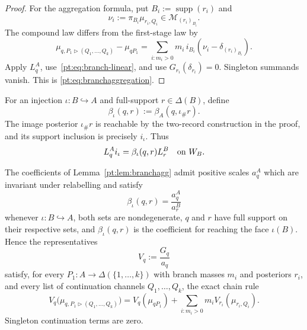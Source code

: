 \begin{proof}
For the aggregation formula, put $B_i:=\operatorname{supp}(r_i)$ and
\[
 \nu_i:=\pi_{B_i}\mu_{r_i,Q_i}\in\mathcal M_{(r_i)_{B_i}}.
\]
The compound law differs from the first-stage law by
\[
 \mu_{q,P_1\triangleright(Q_1,\ldots,Q_k)}-\mu_{qP_1}
 =\sum_{i:m_i>0}m_i\,i_{B_i}
   (\nu_i-\delta_{(r_i)_{B_i}}).
\]
Apply $L_q^A$, use~\eqref{pt:eq:branch-linear}, and use
$G_{r_i}(\delta_{r_i})=0$.  Singleton summands vanish.  This is
\eqref{pt:eq:branchaggregation}.
\end{proof}

For an injection $\iota:B\hookrightarrow A$ and full-support
$r\in\Delta(B)$, define
\[
 \beta_\iota(q,r):=\beta_A(q,\iota_\#r).
\]
The image posterior $\iota_\#r$ is reachable by the two-record construction
in the proof, and its support inclusion is precisely $i_\iota$.  Thus
\[
 L_q^A i_\iota=\beta_\iota(q,r)L_r^B
 \quad\hbox{on }W_B.
\]

\begin{lemma}
\label{pt:lem:chain}
The coefficients of Lemma~\ref{pt:lem:branchagg} admit positive scales
$a_q^A$ which are invariant under relabelling and satisfy
\begin{equation}
 \beta_\iota(q,r)=\frac{a_q^A}{a_r^B}
\tag{FS}\label{pt:eq:facescale}
\end{equation}
whenever $\iota:B\hookrightarrow A$, both sets are nondegenerate, $q$ and
$r$ have full support on their respective sets, and $\beta_\iota(q,r)$ is the
coefficient for reaching the face $\iota(B)$.  Hence the representatives
\[
 V_q:=\frac{G_q}{a_q}
\]
satisfy, for every $P_1:A\to\Delta(\{1,\ldots,k\})$ with branch masses $m_i$ and posteriors $r_i$, and every
list of continuation channels $Q_1,\ldots,Q_k$, the exact chain rule
\begin{equation}
 V_q\bigl(\mu_{q,P_1\triangleright(Q_1,\ldots,Q_k)}\bigr)
 =V_q(\mu_{qP_1})
  +\sum_{i:m_i>0}m_iV_{r_i}(\mu_{r_i,Q_i}).
\tag{CR}\label{pt:eq:chainrule}
\end{equation}
Singleton continuation terms are zero.
\end{lemma}

